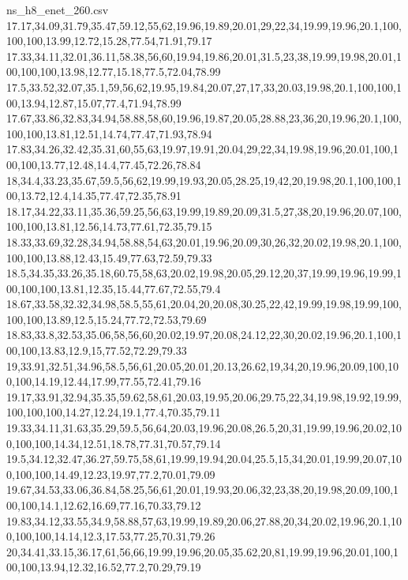\begin{filecontents*}[overwrite]{ns_h8_enet_260.csv}
17.17,34.09,31.79,35.47,59.12,55,62,19.96,19.89,20.01,29,22,34,19.99,19.96,20.1,100,100,100,13.99,12.72,15.28,77.54,71.91,79.17
17.33,34.11,32.01,36.11,58.38,56,60,19.94,19.86,20.01,31.5,23,38,19.99,19.98,20.01,100,100,100,13.98,12.77,15.18,77.5,72.04,78.99
17.5,33.52,32.07,35.1,59,56,62,19.95,19.84,20.07,27,17,33,20.03,19.98,20.1,100,100,100,13.94,12.87,15.07,77.4,71.94,78.99
17.67,33.86,32.83,34.94,58.88,58,60,19.96,19.87,20.05,28.88,23,36,20,19.96,20.1,100,100,100,13.81,12.51,14.74,77.47,71.93,78.94
17.83,34.26,32.42,35.31,60,55,63,19.97,19.91,20.04,29,22,34,19.98,19.96,20.01,100,100,100,13.77,12.48,14.4,77.45,72.26,78.84
18,34.4,33.23,35.67,59.5,56,62,19.99,19.93,20.05,28.25,19,42,20,19.98,20.1,100,100,100,13.72,12.4,14.35,77.47,72.35,78.91
18.17,34.22,33.11,35.36,59.25,56,63,19.99,19.89,20.09,31.5,27,38,20,19.96,20.07,100,100,100,13.81,12.56,14.73,77.61,72.35,79.15
18.33,33.69,32.28,34.94,58.88,54,63,20.01,19.96,20.09,30,26,32,20.02,19.98,20.1,100,100,100,13.88,12.43,15.49,77.63,72.59,79.33
18.5,34.35,33.26,35.18,60.75,58,63,20.02,19.98,20.05,29.12,20,37,19.99,19.96,19.99,100,100,100,13.81,12.35,15.44,77.67,72.55,79.4
18.67,33.58,32.32,34.98,58.5,55,61,20.04,20,20.08,30.25,22,42,19.99,19.98,19.99,100,100,100,13.89,12.5,15.24,77.72,72.53,79.69
18.83,33.8,32.53,35.06,58,56,60,20.02,19.97,20.08,24.12,22,30,20.02,19.96,20.1,100,100,100,13.83,12.9,15,77.52,72.29,79.33
19,33.91,32.51,34.96,58.5,56,61,20.05,20.01,20.13,26.62,19,34,20,19.96,20.09,100,100,100,14.19,12.44,17.99,77.55,72.41,79.16
19.17,33.91,32.94,35.35,59.62,58,61,20.03,19.95,20.06,29.75,22,34,19.98,19.92,19.99,100,100,100,14.27,12.24,19.1,77.4,70.35,79.11
19.33,34.11,31.63,35.29,59.5,56,64,20.03,19.96,20.08,26.5,20,31,19.99,19.96,20.02,100,100,100,14.34,12.51,18.78,77.31,70.57,79.14
19.5,34.12,32.47,36.27,59.75,58,61,19.99,19.94,20.04,25.5,15,34,20.01,19.99,20.07,100,100,100,14.49,12.23,19.97,77.2,70.01,79.09
19.67,34.53,33.06,36.84,58.25,56,61,20.01,19.93,20.06,32,23,38,20,19.98,20.09,100,100,100,14.1,12.62,16.69,77.16,70.33,79.12
19.83,34.12,33.55,34.9,58.88,57,63,19.99,19.89,20.06,27.88,20,34,20.02,19.96,20.1,100,100,100,14.14,12.3,17.53,77.25,70.31,79.26
20,34.41,33.15,36.17,61,56,66,19.99,19.96,20.05,35.62,20,81,19.99,19.96,20.01,100,100,100,13.94,12.32,16.52,77.2,70.29,79.19
\end{filecontents*}

